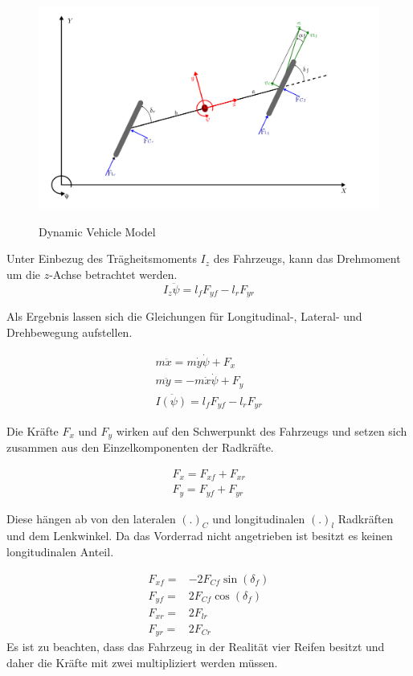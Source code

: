 \documentclass{like}
\begin{document}
\begin{figure}[hb!]
	\caption{Dynamic Vehicle Model}
	\includegraphics[width=350pt]{Abbildungen/dynModel.png}
	\label{fig:dynModel}
\end{figure}




Unter Einbezug des Trägheitsmoments \(I_z\) des Fahrzeugs, kann das Drehmoment um die \(z\)-Achse betrachtet werden.
\begin{equation}
I_z \ddot{\psi} = l_f F_{yf} - l_r F_{yr}
\end{equation}

Als Ergebnis lassen sich die Gleichungen für Longitudinal-, Lateral- und Drehbewegung aufstellen.

\begin{eqnarray}
	m \ddot{x} = m \dot{y} \dot{\psi} + F_x \\
	m \ddot{y} = - m \dot{x} \dot{\psi} + F_y \\
	I \ddot{(\psi)} = l_f F_{yf} - l_r F_{yr}
\end{eqnarray}

Die Kräfte \(F_{x}\) und \(F_{y}\) wirken auf den Schwerpunkt des Fahrzeugs und setzen sich zusammen aus den Einzelkomponenten der Radkräfte.

\begin{eqnarray}
F_x = F_{xf} + F_{xr} \\
F_y = F_{yf} + F_{yr}
\end{eqnarray}

Diese hängen ab von den lateralen \((.)_C\) und longitudinalen \((.)_l\)    Radkräften und dem Lenkwinkel. Da das Vorderrad nicht angetrieben ist besitzt es keinen longitudinalen Anteil. 

\begin{eqnarray}
F_{xf} =& - 2 F_{Cf} \sin(\delta_f) \\
F_{yf} =& 2 F_{Cf} \cos(\delta_f) \\
F_{xr} =& 2 F_{lr} \\
F_{yr} =& 2 F_{Cr}
\end{eqnarray}
Es ist zu beachten, dass das Fahrzeug in der Realität vier Reifen besitzt und daher die Kräfte mit zwei multipliziert werden müssen.
\end{document}
